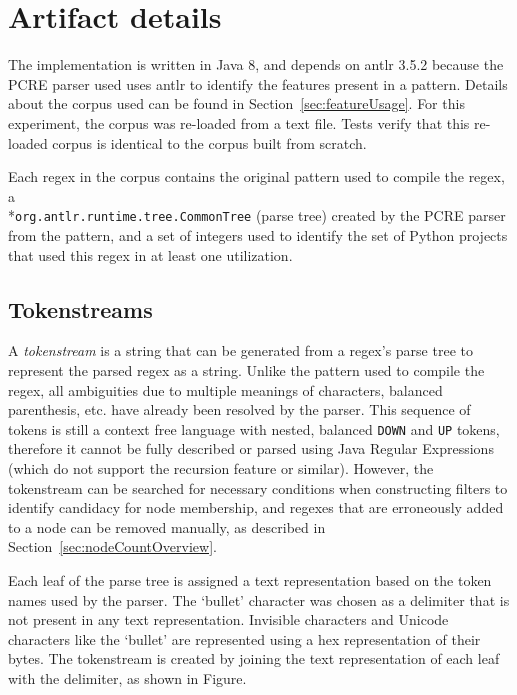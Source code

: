 \section*{Artifact details}
\label{app:nodeCountImplementation}
The implementation is written in Java 8, and depends on antlr 3.5.2 because the PCRE parser used uses antlr to identify the features present in a pattern.  Details about the corpus used can be found in Section~\ref{sec:featureUsage}.  For this experiment, the corpus was re-loaded from a text file.  Tests verify that this re-loaded corpus is identical to the corpus built from scratch.

Each regex in the corpus contains the original pattern used to compile the regex, a
\\*{\tt org.antlr.runtime.tree.CommonTree} (parse tree) created by the PCRE parser from the pattern, and a set of integers used to identify the set of Python projects that used this regex in at least one utilization.

\subsection{Tokenstreams}
A \emph{tokenstream} is a string that can be generated from a regex's parse tree to represent the parsed regex as a string. Unlike the pattern used to compile the regex, all ambiguities due to multiple meanings of characters, balanced parenthesis, etc. have already been resolved by the parser. This sequence of tokens is still a context free language with nested, balanced \verb!DOWN! and \verb!UP! tokens, therefore it cannot be fully described or parsed using Java Regular Expressions (which do not support the recursion feature or similar).  However, the tokenstream can be searched for necessary conditions when constructing filters to identify candidacy for node membership, and regexes that are erroneously added to a node can be removed manually, as described in Section~\ref{sec:nodeCountOverview}.

Each leaf of the parse tree is assigned a text representation based on the token names used by the parser.  The `bullet' character was chosen as a delimiter that is not present in any text representation.  Invisible characters and Unicode characters like the `bullet' are represented using a hex representation of their bytes.  The tokenstream is created by joining the text representation of each leaf with the delimiter, as shown in Figure.


